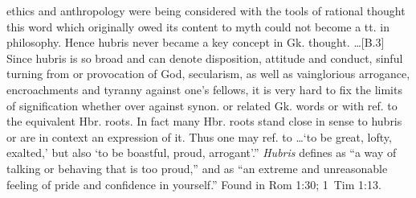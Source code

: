 ethics and anthropology were being considered with the tools of rational thought this word which originally owed its content to myth could not become a tt. in philosophy. Hence hubris never became a key concept in Gk. thought. \ldots [B.3] Since hubris is so broad and can denote disposition, attitude and conduct, sinful turning from or provocation of God, secularism, as well as vainglorious arrogance, encroachments and tyranny against one's fellows, it is very hard to fix the limits of signification whether over against synon. or related Gk. words or with ref. to the equivalent Hbr. roots. In fact many Hbr. roots stand close in sense to hubris or are in context an expression of it. Thus one may ref. to \ldots `to be great, lofty, exalted,' but also `to be boastful, proud, arrogant'.''
 \emph{Hubris} defines as ``a way of talking or behaving that is too proud,'' and as ``an extreme and unreasonable feeling of pride and confidence in yourself.''
Found in Rom 1:30; 1~Tim 1:13.
